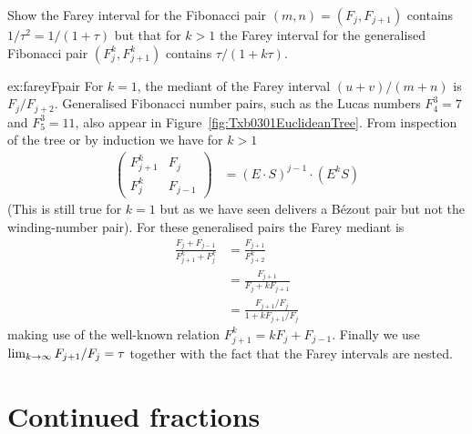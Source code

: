 \begin{jExercise}\label{ex:fareyFpair}
	Show  the Farey interval for the Fibonacci pair $(m,n)= (F_j,F_{j+1})$ contains $1/\tau^2=1/(1+\tau)$ but that for $k>1$ the Farey interval for the generalised Fibonacci pair $(F^k_j,F^k_{j+1})$ contains $\tau/(1+ k \tau)$.
\end{jExercise}
\begin{jAnswer}{ex:fareyFpair}  {
For  $k=1$, the mediant of the Farey interval $(u+v)/(m+n)$ is $F_j/F_{j+2}$. 
Generalised Fibonacci number pairs, such as the Lucas numbers $F^3_4=7$ and $F^3_5=11$, also appear in Figure~\ref{fig:Txb0301EuclideanTree}. From inspection of the tree or by induction we have for $k>1$
\begin{align}
	\begin{pmatrix} 
		F^k_{j+1} & F_j 
		\\
		F^k_j & F_{j-1}
	\end{pmatrix} &= 	(E\cdot  S)^{j-1} \cdot  (E^k S) 
	\label{eq:GeneralizedFibonacciMatrix}
\end{align}
(This is still true for $k=1$ but as we have seen delivers a B\'ezout pair but not the winding-number pair). For these generalised pairs the Farey mediant is 
\begin{align}
	\frac{	 F_j + F_{j-1}}{F^k_{j+1}+F^k_{j}}&=	\frac{	 F_{j+1}}{F^k_{j+2}}
\\
	&= 	\frac{	 F_{j+1}}{F_{j} + k F_{j+1}}
		\\&= \frac{ F_{j+1}/F_{j}}{1+ k F_{j+1}/F_{j}}
\end{align}	
making use of the well-known relation $	F^k_{j+1} =   k F_j+ F_{j-1}$. Finally we use $\lim_{ k\rightarrow \infty}  F_{j+1}/F_{j}=\tau$ together with the fact that the Farey intervals are nested.
}
\end{jAnswer}

\section{Continued fractions}


